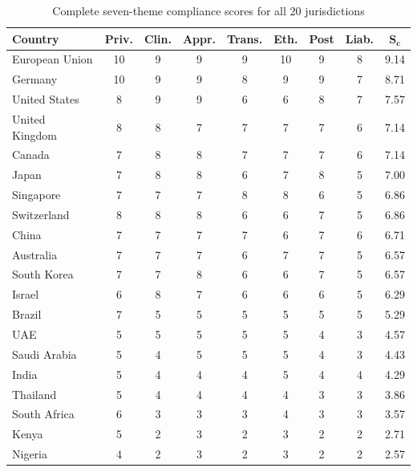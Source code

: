 \begin{table}[htbp]
\centering
\caption{Complete seven-theme compliance scores for all 20 jurisdictions}
\label{tab:country-scores}
\scriptsize
\begin{tabular}{@{}l ccccccc c@{}}
\toprule
\textbf{Country} & \textbf{Priv.} & \textbf{Clin.} & \textbf{Appr.} & \textbf{Trans.} & \textbf{Eth.} & \textbf{Post} & \textbf{Liab.} & $\boldsymbol{S_c}$ \\
\midrule
European Union & 10 & 9 & 9 & 9 & 10 & 9 & 8 & 9.14 \\
Germany & 10 & 9 & 9 & 8 & 9 & 9 & 7 & 8.71 \\
United States & 8 & 9 & 9 & 6 & 6 & 8 & 7 & 7.57 \\
United Kingdom & 8 & 8 & 7 & 7 & 7 & 7 & 6 & 7.14 \\
Canada & 7 & 8 & 8 & 7 & 7 & 7 & 6 & 7.14 \\
Japan & 7 & 8 & 8 & 6 & 7 & 8 & 5 & 7.00 \\
Singapore & 7 & 7 & 7 & 8 & 8 & 6 & 5 & 6.86 \\
Switzerland & 8 & 8 & 8 & 6 & 6 & 7 & 5 & 6.86 \\
China & 7 & 7 & 7 & 7 & 6 & 7 & 6 & 6.71 \\
Australia & 7 & 7 & 7 & 6 & 7 & 7 & 5 & 6.57 \\
South Korea & 7 & 7 & 8 & 6 & 6 & 7 & 5 & 6.57 \\
Israel & 6 & 8 & 7 & 6 & 6 & 6 & 5 & 6.29 \\
Brazil & 7 & 5 & 5 & 5 & 5 & 5 & 5 & 5.29 \\
UAE & 5 & 5 & 5 & 5 & 5 & 4 & 3 & 4.57 \\
Saudi Arabia & 5 & 4 & 5 & 5 & 5 & 4 & 3 & 4.43 \\
India & 5 & 4 & 4 & 4 & 5 & 4 & 4 & 4.29 \\
Thailand & 5 & 4 & 4 & 4 & 4 & 3 & 3 & 3.86 \\
South Africa & 6 & 3 & 3 & 3 & 4 & 3 & 3 & 3.57 \\
Kenya & 5 & 2 & 3 & 2 & 3 & 2 & 2 & 2.71 \\
Nigeria & 4 & 2 & 3 & 2 & 3 & 2 & 2 & 2.57 \\
\bottomrule
\end{tabular}
\end{table}
